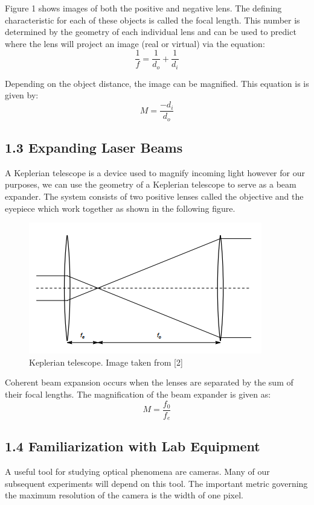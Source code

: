 \documentclass[letter, 11pt, onecolumn]{article}
\begin{document}
		\noindent Figure 1 shows images of both the positive and negative lens. The defining characteristic for each of these objects is called the focal length. This number is determined by the geometry of each individual lens and can be used to predict where the lens will project an image (real or virtual) via the equation: 
			\begin{equation}
				\frac{1}{f} = \frac{1}{d_o}+\frac{1}{d_i}
			\end{equation}
		
		\noindent Depending on the object distance, the image can be magnified. This equation is is given by:
			\begin{equation}
				M = \frac{-d_i}{d_o}
			\end{equation}
			
		\subsection*{1.3 Expanding Laser Beams}
		A Keplerian telescope is a device used to magnify incoming light however for our purposes, we can use the geometry of a Keplerian telescope to serve as a beam expander. The system consists of two positive lenses called the objective and the eyepiece which work together as shown in the following figure.
			\begin{figure}[h!]
				\centering
				\includegraphics[width=0.45\columnwidth]{telescope}
				\caption{Keplerian telescope. Image taken from [2]}
			\end{figure}
		Coherent beam expansion occurs when the lenses are separated by the sum of their focal lengths. The magnification of the beam expander is given as:	
			\begin{equation}
				M = \frac{f_0}{f_e}
			\end{equation}
			
		\subsection*{1.4 Familiarization with Lab Equipment}
		A useful tool for studying optical phenomena are cameras. Many of our subsequent experiments will depend on this tool. The important metric governing the maximum resolution of the camera is the width of one pixel. 
	
\end{document}
